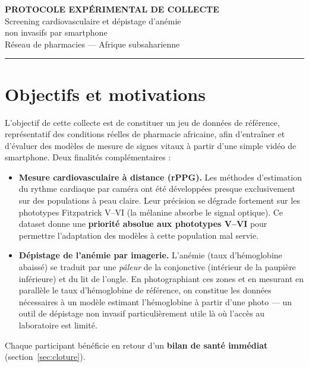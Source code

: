 \documentclass[11pt,a4paper]{article}
\begin{document}
\begin{center}
{\LARGE\bfseries PROTOCOLE EXPÉRIMENTAL DE COLLECTE}\\[6pt]
{\large Screening cardiovasculaire et dépistage d'anémie\\ non invasifs par smartphone}\\[4pt]
{\normalsize Réseau de pharmacies --- Afrique subsaharienne}
\end{center}

\noindent\rule{\textwidth}{0.6pt}
\vspace{0.2cm}

\section{Objectifs et motivations}

L'objectif de cette collecte est de constituer un jeu de données de référence,
représentatif des conditions réelles de pharmacie africaine, afin d'entraîner et
d'évaluer des modèles de mesure de signes vitaux à partir d'une simple vidéo de
smartphone. Deux finalités complémentaires :

\begin{itemize}
\item \textbf{Mesure cardiovasculaire à distance (rPPG).} Les méthodes
d'estimation du rythme cardiaque par caméra ont été développées presque
exclusivement sur des populations à peau claire. Leur précision se dégrade
fortement sur les phototypes Fitzpatrick V--VI (la mélanine absorbe le signal
optique). Ce dataset donne une \textbf{priorité absolue aux phototypes V--VI}
pour permettre l'adaptation des modèles à cette population mal servie.
\item \textbf{Dépistage de l'anémie par imagerie.} L'anémie (taux d'hémoglobine
abaissé) se traduit par une \emph{pâleur} de la conjonctive (intérieur de la
paupière inférieure) et du lit de l'ongle. En photographiant ces zones et en
mesurant en parallèle le taux d'hémoglobine de référence, on constitue les
données nécessaires à un modèle estimant l'hémoglobine à partir d'une photo ---
un outil de dépistage non invasif particulièrement utile là où l'accès au
laboratoire est limité.
\end{itemize}

Chaque participant bénéficie en retour d'un \textbf{bilan de santé immédiat}
(section~\ref{sec:cloture}).
\end{document}
